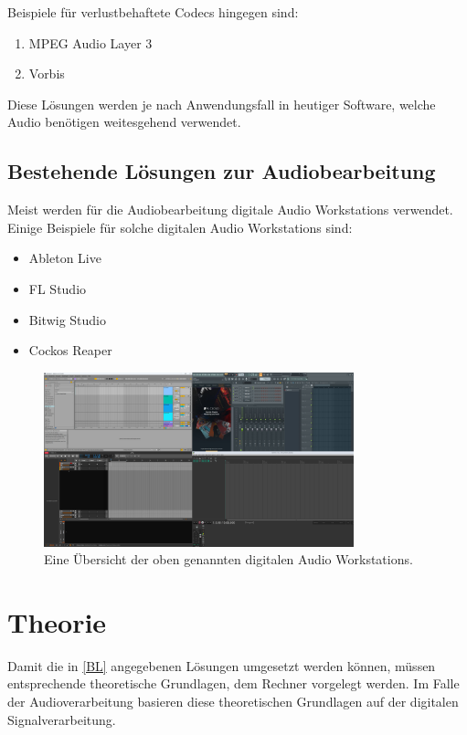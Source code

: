 \documentclass[paper=a4,fontsize=12pt,ngerman]{scrartcl}
\begin{document}
Beispiele für verlustbehaftete Codecs hingegen sind:

\begin{enumerate}
    \item MPEG Audio Layer 3
    \item Vorbis
\end{enumerate}


Diese Lösungen werden je nach Anwendungsfall in heutiger Software, welche Audio benötigen weitesgehend verwendet.

\subsection{Bestehende Lösungen zur Audiobearbeitung}

Meist werden für die Audiobearbeitung digitale Audio Workstations verwendet. 
Einige Beispiele für solche digitalen Audio Workstations sind:

\begin{itemize}
    \item Ableton Live
    \item FL Studio
    \item Bitwig Studio
    \item Cockos Reaper
\end{itemize}

\begin{figure}[H]
    \centering
    \includegraphics[width=0.8\textwidth]{graphics/DAWs.png}
    \caption{Eine Übersicht der oben genannten digitalen Audio Workstations.}
\end{figure}


\section{Theorie}

Damit die in \ref{BL} angegebenen Lösungen umgesetzt werden können, müssen entsprechende theoretische Grundlagen, dem Rechner vorgelegt werden.
Im Falle der Audioverarbeitung basieren diese theoretischen Grundlagen auf der digitalen Signalverarbeitung.
\end{document}
